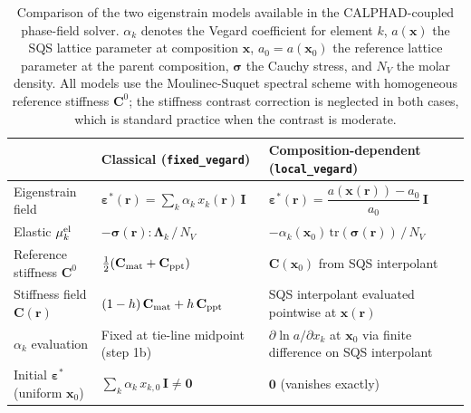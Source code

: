 {\begin{table}[htbp]
    \centering
    \caption{%
        \color{blue}
        Comparison of the two eigenstrain models available in the
        CALPHAD-coupled phase-field solver.
        $\alpha_k$ denotes the Vegard coefficient for element $k$,
        $a(\boldsymbol{x})$ the SQS lattice parameter at composition
        $\boldsymbol{x}$, $a_0 = a(\boldsymbol{x}_0)$ the reference
        lattice parameter at the parent composition, $\boldsymbol{\sigma}$
        the Cauchy stress, and $N_V$ the molar density.
        All models use the Moulinec-Suquet spectral scheme with
        homogeneous reference stiffness $\mathbf{C}^0$; the stiffness
        contrast correction is neglected in both cases, which is standard
        practice when the contrast is moderate.
    }
    \label{tab:eigenstrain_models}
    \renewcommand{\arraystretch}{1.35}
    \small\color{blue}
    \begin{tabular}{lp{4.2cm}p{3.6cm}p{3.4cm}}
        \toprule
        & \textbf{Classical} (\texttt{fixed\_vegard})
        & \multicolumn{2}{l}{\textbf{Composition-dependent} (\texttt{local\_vegard})} \\
        \midrule
        Eigenstrain field
        & $\boldsymbol{\varepsilon}^*(\boldsymbol{r}) = \displaystyle\sum_k \alpha_k\, x_k(\boldsymbol{r})\,\mathbf{I}$
        & \multicolumn{2}{l}{$\boldsymbol{\varepsilon}^*(\boldsymbol{r}) = \dfrac{a(\boldsymbol{x}(\boldsymbol{r})) - a_0}{a_0}\,\mathbf{I}$} \\[6pt]
        Elastic $\mu_k^{\rm el}$
        & $-\boldsymbol{\sigma}(\boldsymbol{r}):\boldsymbol{\Lambda}_k\,/\,N_V$
        & \multicolumn{2}{l}{$-\alpha_k(\boldsymbol{x}_0)\,\mathrm{tr}(\boldsymbol{\sigma}(\boldsymbol{r}))\,/\,N_V$} \\[4pt]
        Reference stiffness $\mathbf{C}^0$
        & $\tfrac{1}{2}(\mathbf{C}_{\rm mat} + \mathbf{C}_{\rm ppt})$
        & \multicolumn{2}{l}{$\mathbf{C}(\boldsymbol{x}_0)$ from SQS interpolant} \\[4pt]
        Stiffness field $\mathbf{C}(\boldsymbol{r})$
        & $(1-h)\,\mathbf{C}_{\rm mat} + h\,\mathbf{C}_{\rm ppt}$
        & \multicolumn{2}{l}{SQS interpolant evaluated pointwise at $\boldsymbol{x}(\boldsymbol{r})$} \\[4pt]
        $\alpha_k$ evaluation
        & Fixed at tie-line midpoint (step 1b)
        & \multicolumn{2}{l}{$\partial\ln a/\partial x_k$ at $\boldsymbol{x}_0$ via finite difference on SQS interpolant} \\[4pt]
        Initial $\boldsymbol{\varepsilon}^*$ (uniform $\boldsymbol{x}_0$)
        & $\sum_k \alpha_k\, x_{k,0}\,\mathbf{I} \neq \mathbf{0}$
        & \multicolumn{2}{l}{$\mathbf{0}$ (vanishes exactly)} \\
        \bottomrule
    \end{tabular}
\end{table}

}
